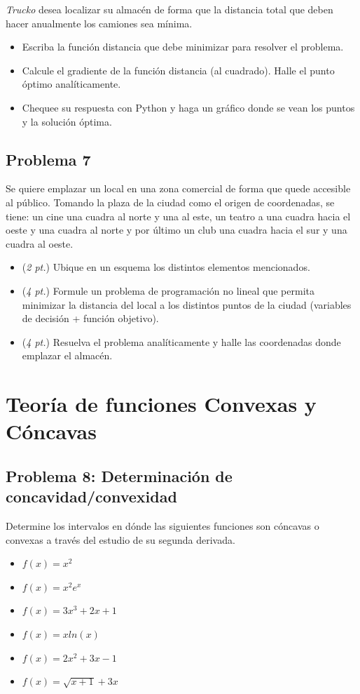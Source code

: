 \documentclass[12pt]{article}
\begin{document}
\textit{Trucko} desea localizar su almacén de forma que la distancia total que deben hacer anualmente los camiones sea mínima. 

\begin{itemize}
    \item[a)] Escriba la función distancia que debe minimizar para resolver el problema.
    \item[b)] Calcule el gradiente de la función distancia (al cuadrado). Halle el punto óptimo analíticamente.
    \item[c)] Chequee su respuesta con Python y haga un gráfico donde se vean los puntos y la solución óptima.
\end{itemize}

\subsection*{Problema 7}
Se quiere emplazar un local en una zona comercial de forma que quede accesible al público. Tomando la plaza de la ciudad como el origen de coordenadas, se tiene: un cine una cuadra al norte y una al este, un teatro a una cuadra hacia el oeste y una cuadra al norte y por último un club una cuadra hacia el sur y una cuadra al oeste. 
\begin{itemize}
    \item[a)] (\textit{2 pt.}) Ubique en un esquema los distintos elementos mencionados.
    \item[b)] (\textit{4 pt.}) Formule un problema de programación no lineal que permita minimizar la distancia del local a los distintos puntos de la ciudad (variables de decisión + función objetivo).
    \item[c)] (\textit{4 pt.}) Resuelva el problema analíticamente y halle las coordenadas donde emplazar el almacén.
\end{itemize}

\section{Teoría de funciones Convexas y Cóncavas}

\subsection*{Problema 8: Determinación de concavidad/convexidad}

Determine los intervalos en dónde las siguientes funciones son cóncavas o convexas a través del estudio de su segunda derivada. 
\begin{itemize}
    \item[a)] $f(x) = x^2$
    \item[b)] $f(x) = x^2 e^{x}$ 
    \item[c)] $f(x) = 3x^3 + 2x + 1$
    \item[d)] $f(x) = x ln(x)$
    \item[e)] $f(x) = 2 x^2 + 3x - 1 $
    \item[f)] $f(x) = \sqrt{x+1} + 3x $    
\end{itemize}
\end{document}
